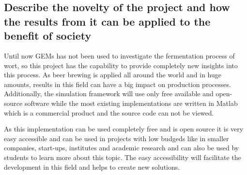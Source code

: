 
\subsection*{Describe the novelty of the project and how the results from it can be applied to the benefit of society}

Until now GEMs has not been used to investigate the fermentation process of wort, so this project has the capability to provide completely
new insights into this process. As beer brewing is applied all around the world and in huge amounts, results in this field can have a big
impact on production processes.
Additionally, the simulation framework will use only free available and open-source software while the most existing implementations are written in Matlab
which is a commercial product and the source code can not be viewed.


As this implementation can be used completely free and is open source it is very easy accessible and can be used in projects with low budgeds
like in smaller companies, start-ups, institutes and academic research and can also be used by students to learn more about this topic.
The easy accessibility will facilitate the development in this field and helps to create new solutions.


